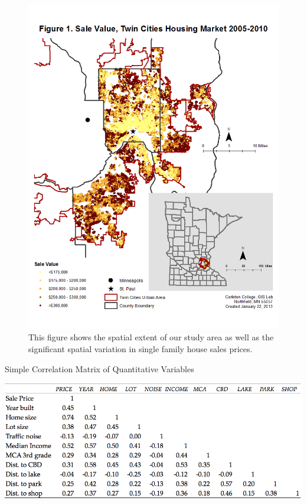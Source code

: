 \documentclass{article}\usepackage{graphicx, color}
\begin{document}
\begin{figure}
\includegraphics[width = \textwidth]{../graphs/StudyArea_SaleValueDistribution}
\caption{This figure shows the spatial extent of our study area as well as the significant spatial variation in single family house sales prices.}
\end{figure}

\begin{table}
\caption{Simple Correlation Matrix of Quantitative Variables}\label{tab:cor}
\includegraphics[width = \textwidth]{../graphs/CorrelationMatrix}
\end{table}
\end{document}

